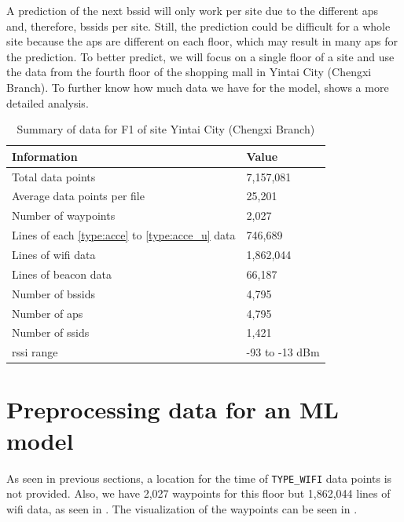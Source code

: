 A prediction of the next \ac{bssid} will only work per site due to the different \acp{ap} and, therefore, \acp{bssid} per site.
Still, the prediction could be difficult for a whole site because the \acp{ap} are different on each floor, which may result in many \acp{ap} for the prediction.
To better predict, we will focus on a single floor of a site and use the data from the fourth floor of the shopping mall in Yintai City (Chengxi Branch).
To further know how much data we have for the model,  shows a more detailed analysis.
\begin{table}[h]
    \centering
    \caption{Summary of data for F1 of site Yintai City (Chengxi Branch)}
    \begin{tabular}{|l|l|}
    \hline
    \textbf{Information} & \textbf{Value} \\ \hline
    Total data points & 7,157,081 \\ \hline
    Average data points per file & 25,201 \\ \hline
    Number of waypoints & 2,027 \\ \hline
    Lines of each \ref{type:acce} to \ref{type:acce_u} data & 746,689 \\ \hline
    Lines of \ac{wifi} data & 1,862,044 \\ \hline
    Lines of beacon data & 66,187 \\ \hline
    Number of \acp{bssid} & 4,795 \\ \hline
    Number of \acp{ap} & 4,795 \\ \hline
    Number of \acp{ssid} & 1,421 \\ \hline
    \ac{rssi} range & -93 to -13 dBm \\ \hline
    \end{tabular}
\label{tab:data_summary}
\end{table}


\section{Preprocessing data for an ML model}\label{sec:prep-on-data-for-an-ml-model}

As seen in previous sections, a location for the time of \texttt{TYPE\_WIFI} data points is not provided.
Also, we have 2,027 waypoints for this floor but 1,862,044 lines of \ac{wifi} data, as seen in .
The visualization of the waypoints can be seen in .

